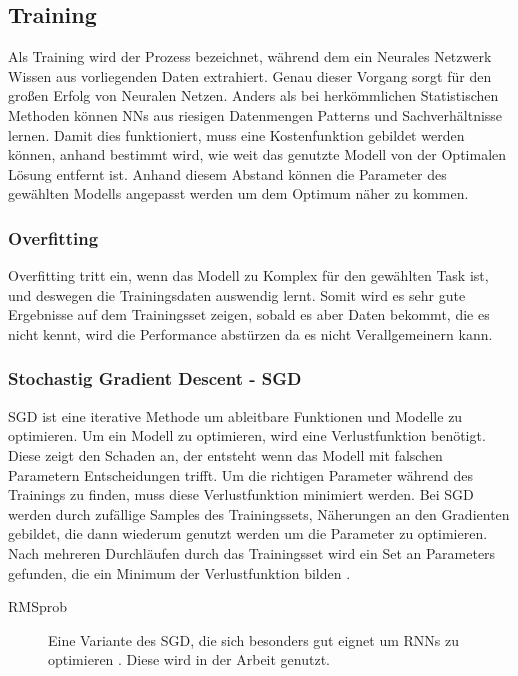 \documentclass[pdftex,a4paper,halfparskip, article]{scrartcl}
\begin{document}
\subsection{Training}

Als Training wird der Prozess bezeichnet, während dem ein Neurales Netzwerk Wissen aus vorliegenden Daten extrahiert. Genau dieser Vorgang sorgt für den großen Erfolg von Neuralen Netzen. Anders als bei herkömmlichen Statistischen Methoden können NNs aus riesigen Datenmengen Patterns und Sachverhältnisse lernen. Damit dies funktioniert, muss eine Kostenfunktion gebildet werden können, anhand bestimmt wird, wie weit das genutzte Modell von der Optimalen Lösung entfernt ist. Anhand diesem Abstand können die Parameter des gewählten Modells angepasst werden um dem Optimum näher zu kommen.

\subsubsection{Overfitting}
	
Overfitting tritt ein, wenn das Modell zu Komplex für den gewählten Task ist, und deswegen die Trainingsdaten auswendig lernt. Somit wird es sehr gute Ergebnisse auf dem Trainingsset zeigen, sobald es aber Daten bekommt, die es nicht kennt, wird die Performance abstürzen da es nicht Verallgemeinern kann.

\subsubsection{Stochastig Gradient Descent - SGD}

SGD ist eine iterative Methode um ableitbare Funktionen und Modelle zu optimieren. Um ein Modell zu optimieren, wird eine Verlustfunktion benötigt. Diese zeigt den Schaden an, der entsteht wenn das Modell mit falschen Parametern Entscheidungen trifft. Um die richtigen Parameter während des Trainings zu finden, muss diese Verlustfunktion minimiert werden.
Bei SGD werden durch zufällige Samples des Trainingssets, Näherungen an den Gradienten gebildet, die dann wiederum genutzt werden um die Parameter zu optimieren. Nach mehreren Durchläufen durch das Trainingsset wird ein Set an Parameters gefunden, die ein Minimum der Verlustfunktion bilden \cite{walkSGD}. 


\begin{description}
	\item[RMSprob] Eine Variante des SGD, die sich besonders gut eignet um RNNs zu optimieren \cite{kerasDocRMSprob}. Diese wird in der Arbeit genutzt.
\end{description}
\end{document}
